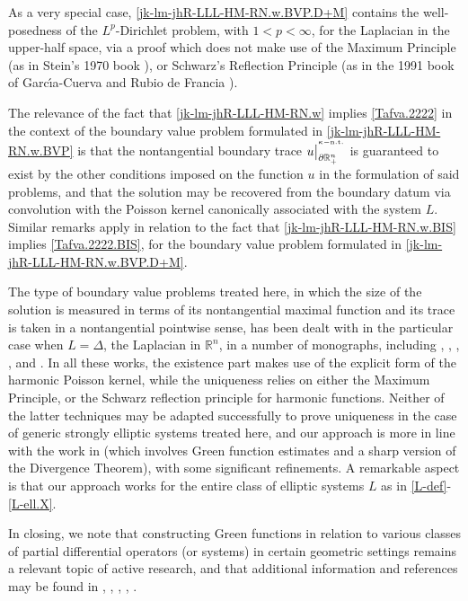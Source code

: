 \documentclass[11pt,reqno]{amsart}
\numberwithin{equation}{section}
\theoremstyle{remark}
\begin{document}
As a very special case, \eqref{jk-lm-jhR-LLL-HM-RN.w.BVP.D+M} contains the well-posedness of the $L^p$-Dirichlet problem, with $1<p<\infty$, 
for the Laplacian in the upper-half space, via a proof which does not make use of the Maximum Principle (as in Stein's 1970 book \cite{St70}), 
or Schwarz's Reflection Principle (as in the 1991 book of Garc{\'\i}a-Cuerva and Rubio de Francia \cite{GCRF85}).

The relevance of the fact that \eqref{jk-lm-jhR-LLL-HM-RN.w} 
implies \eqref{Tafva.2222} in the context of the boundary value problem formulated in \eqref{jk-lm-jhR-LLL-HM-RN.w.BVP} 
is that the nontangential boundary trace $u\big|^{{}^{\kappa-{\rm n.t.}}}_{\partial{\mathbb{R}}^n_{+}}$ is guaranteed to exist 
by the other conditions imposed on the function $u$ in the formulation of said problems, 
and that the solution may be recovered from the boundary datum via convolution 
with the Poisson kernel canonically associated with the system $L$.
Similar remarks apply in relation to the fact that \eqref{jk-lm-jhR-LLL-HM-RN.w.BIS} implies \eqref{Tafva.2222.BIS}, for the 
boundary value problem formulated in \eqref{jk-lm-jhR-LLL-HM-RN.w.BVP.D+M}.

The type of boundary value problems treated here, in which the size of the solution is measured in 
terms of its nontangential maximal function and its trace is taken in a nontangential 
pointwise sense, has been dealt with in the particular case when $L=\Delta$, 
the Laplacian in ${\mathbb{R}}^n$, in a number of monographs, including \cite{ABR}, \cite{GCRF85}, 
\cite{St70}, \cite{Stein93}, and \cite{StWe71}. In all these works, the existence part 
makes use of the explicit form of the harmonic Poisson kernel, 
while the uniqueness relies on either the Maximum Principle, or the Schwarz reflection 
principle for harmonic functions. Neither of the latter techniques may be adapted
successfully to prove uniqueness in the case of generic strongly elliptic systems treated here, and 
our approach is more in line with the work in \cite{MMMM16} (which involves 
Green function estimates and a sharp version of the Divergence Theorem), with some 
significant refinements. A remarkable aspect is that our approach works for the entire 
class of elliptic systems $L$ as in \eqref{L-def}-\eqref{L-ell.X}. 

In closing, we note that constructing Green functions in relation to various classes of 
partial differential operators (or systems) in certain geometric settings remains a relevant topic of active research, 
and that additional information and references may be found in \cite{DK21}, \cite{HK07}, \cite{HK20}, \cite{OKB15}, \cite{TKB12}.
\end{document}
